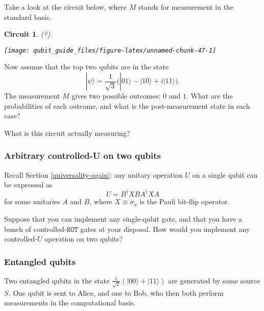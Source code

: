 \documentclass[fleqn]{article}
\newtheorem*{circuit}{Circuit}
\begin{document}
Take a look at the circuit below, where \(M\) stands for measurement in the standard basis.

\begin{circuit}

(?).

\begin{center}\texttt{[image: qubit\_guide\_files/figure-latex/unnamed-chunk-47-1]} \end{center}

\end{circuit}

Now assume that the top two qubits are in the state
\[
  |\psi\rangle
  = \frac{1}{\sqrt3}\big( |01\rangle - |10\rangle + i|11\rangle \big).
\]
The measurement \(M\) gives two possible outcomes: \(0\) and \(1\).
What are the probabilities of each outcome, and what is the post-measurement state in each case?

What is this circuit actually measuring?

\hypertarget{arbitrary-controlled-u-on-two-qubits}{%
\subsubsection{Arbitrary controlled-U on two qubits}\label{arbitrary-controlled-u-on-two-qubits}}

Recall Section \ref{universality-again}: any unitary operation \(U\) on a single qubit can be expressed as
\[
  U = B^\dagger XBA^\dagger XA
\]
for some unitaries \(A\) and \(B\), where \(X\equiv\sigma_x\) is the Pauli bit-flip operator.

Suppose that you can implement any single-qubit gate, and that you have a bunch of controlled-\(\texttt{NOT}\) gates at your disposal.
How would you implement any controlled-\(U\) operation on two qubits?

\hypertarget{entangled-qubits}{%
\subsubsection{Entangled qubits}\label{entangled-qubits}}

Two entangled qubits in the state \(\frac{1}{\sqrt{2}}(|00\rangle+|11\rangle)\) are generated by some source \(S\).
One qubit is sent to Alice, and one to Bob, who then both perform measurements in the computational basis.
\end{document}
